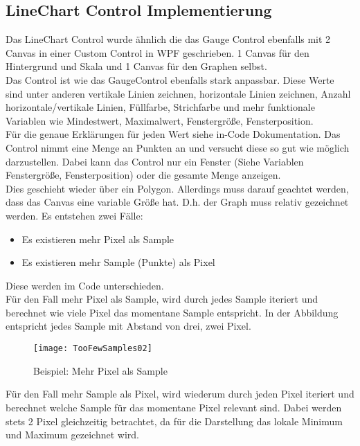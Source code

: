 \subsection{LineChart Control Implementierung}
Das LineChart Control wurde ähnlich die das Gauge Control ebenfalls mit 2 Canvas in einer Custom Control in WPF geschrieben. 1 Canvas für den Hintergrund und Skala und 1 Canvas für den Graphen selbst.\\
Das Control ist wie das GaugeControl ebenfalls stark anpassbar. Diese Werte sind unter anderen vertikale Linien zeichnen, horizontale Linien zeichnen, Anzahl horizontale/vertikale Linien, Füllfarbe, Strichfarbe und mehr funktionale Variablen wie Mindestwert, Maximalwert, Fenstergröße, Fensterposition.\\
Für die genaue Erklärungen für jeden Wert siehe in-Code Dokumentation.
Das Control nimmt eine Menge an Punkten an und versucht diese so gut wie möglich darzustellen. Dabei kann das Control nur ein Fenster (Siehe Variablen Fenstergröße, Fensterposition) oder die gesamte Menge anzeigen.\\
Dies geschieht wieder über ein Polygon. Allerdings muss darauf geachtet werden, dass das Canvas eine variable Größe hat. D.h. der Graph muss relativ gezeichnet werden. Es entstehen zwei Fälle:\\
\begin{itemize}
	\item Es existieren mehr Pixel als Sample
	\item Es existieren mehr Sample (Punkte) als Pixel
\end{itemize}
Diese werden im Code unterschieden.\\
\newpage
Für den Fall mehr Pixel als Sample, wird durch jedes Sample iteriert und berechnet wie viele Pixel das momentane Sample entspricht. In der Abbildung entspricht jedes Sample mit Abstand von drei, zwei Pixel.\\
\begin{figure}[ht]
	\centering
	\texttt{[image: TooFewSamples02]}
	\caption{Beispiel: Mehr Pixel als Sample}
	\label{fig:gauge}
\end{figure}

Für den Fall mehr Sample als Pixel, wird wiederum durch jeden Pixel iteriert und berechnet welche Sample für das momentane Pixel relevant sind. Dabei werden stets 2 Pixel gleichzeitig betrachtet, da für die Darstellung das lokale Minimum und Maximum gezeichnet wird.\\

